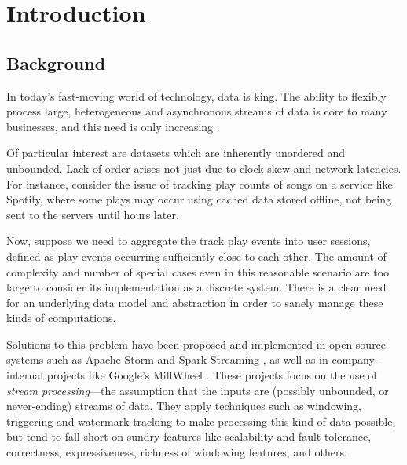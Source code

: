 \chapter{Introduction}\label{ch:intro}


\section{Background}\label{sec:intro:background}

In today's fast-moving world of technology, data is king.
The ability to flexibly process large, heterogeneous and asynchronous streams of data is core to many businesses, and this need is only increasing \cite{Yin_2015}\cite{mit_bean_variety}.

Of particular interest are datasets which are inherently unordered and unbounded.
Lack of order arises not just due to clock skew and network latencies.
For instance, consider the issue of tracking play counts of songs on a service like Spotify, where some plays may occur using cached data stored offline, not being sent to the servers until hours later.

Now, suppose we need to aggregate the track play events into user sessions, defined as play events occurring sufficiently close to each other.
The amount of complexity and number of special cases even in this reasonable scenario are too large to consider its implementation as a discrete system.
There is a clear need for an underlying data model and abstraction in order to sanely manage these kinds of computations.

Solutions to this problem have been proposed and implemented in open-source systems such as Apache Storm \cite{apache_storm} and Spark Streaming \cite{spark:zaharia2013discretized}, as well as in company-internal projects like Google's MillWheel \cite{akidau2013millwheel}.
These projects focus on the use of \emph{stream processing}---the assumption that the inputs are (possibly unbounded, or never-ending) streams of data.
They apply techniques such as windowing, triggering and watermark tracking to make processing this kind of data possible, but tend to fall short on sundry features like scalability and fault tolerance, correctness, expressiveness, richness of windowing features, and others.

